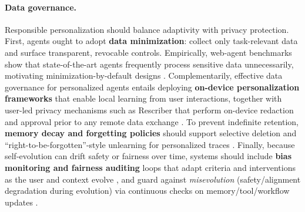 \documentclass[10pt]{article} %
\begin{document}
\paragraph{Data governance.}
Responsible personalization should balance adaptivity with privacy protection. First, agents ought to adopt \textbf{data minimization}: collect only task-relevant data and surface transparent, revocable controls. Empirically, web-agent benchmarks show that state-of-the-art agents frequently process sensitive data unnecessarily, motivating minimization-by-default designs \citep{zharmagambetov2025agentdam}. Complementarily, effective data governance for personalized agents entails deploying \textbf{on-device personalization frameworks} that enable local learning from user interactions, together with user-led privacy mechanisms such as Rescriber that perform on-device redaction and approval prior to any remote data exchange \citep{zhou2025rescriber}. To prevent indefinite retention, \textbf{memory decay and forgetting policies} should support selective deletion and “right-to-be-forgotten”-style unlearning for personalized traces \citep{staufer2025should}. Finally, because self-evolution can drift safety or fairness over time, systems should include \textbf{bias monitoring and fairness auditing} loops that adapt criteria and interventions as the user and context evolve \citep{basu2025fair}, and guard against \emph{misevolution} (safety/alignment degradation during evolution) via continuous checks on memory/tool/workflow updates \citep{shao2025misevolution}.
\end{document}
